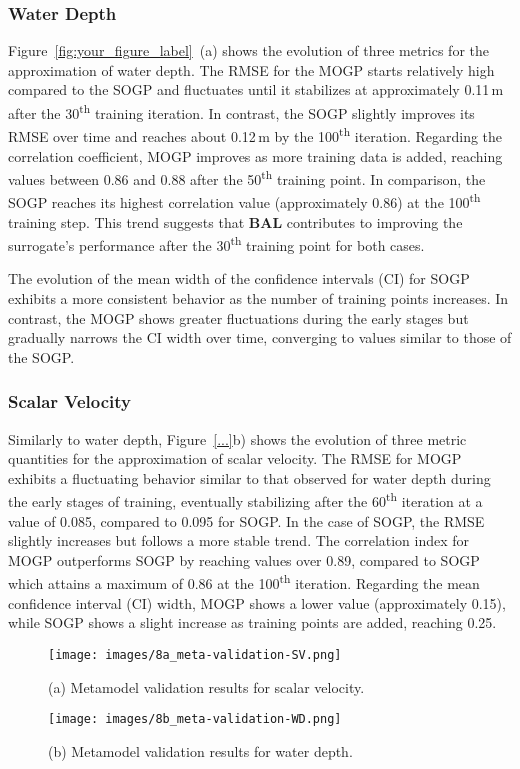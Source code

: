 \documentclass[draft,linenumbers,onecolumn]{agujournal2019} %
\begin{document}
\subsubsection{Water Depth}
Figure~\ref{fig:your_figure_label}~(a) shows the evolution of three metrics for the approximation of water depth. The RMSE for the MOGP starts relatively high compared to the SOGP and fluctuates until it stabilizes at approximately 0.11\,m after the 30\textsuperscript{th} training iteration. In contrast, the SOGP slightly improves its RMSE over time and reaches about 0.12\,m by the 100\textsuperscript{th} iteration.
Regarding the correlation coefficient, MOGP improves as more training data is added, reaching values between 0.86 and 0.88 after the 50\textsuperscript{th} training point. In comparison, the SOGP reaches its highest correlation value (approximately 0.86) at the 100\textsuperscript{th} training step. This trend suggests that \textbf{BAL} contributes to improving the surrogate’s performance after the 30\textsuperscript{th} training point for both cases.

The evolution of the mean width of the confidence intervals (CI) for SOGP exhibits a more consistent behavior as the number of training points increases. In contrast, the MOGP shows greater fluctuations during the early stages but gradually narrows the CI width over time, converging to values similar to those of the SOGP.

\subsubsection{Scalar Velocity}
Similarly to water depth, Figure~\ref{...}b) shows the evolution of three metric quantities for the approximation of scalar velocity. The RMSE for MOGP exhibits a fluctuating behavior similar to that observed for water depth during the early stages of training, eventually stabilizing after the 60\textsuperscript{th} iteration at a value of 0.085, compared to 0.095 for SOGP. In the case of SOGP, the RMSE slightly increases but follows a more stable trend. The correlation index for MOGP outperforms SOGP by reaching values over 0.89, compared to SOGP which attains a maximum of 0.86 at the 100\textsuperscript{th} iteration. Regarding the mean confidence interval (CI) width, MOGP shows a lower value (approximately 0.15), while SOGP shows a slight increase as training points are added, reaching 0.25.

\begin{figure}[!htbp]
	\centering
	\begin{minipage}[b]{0.49\textwidth}
		\centering
		\texttt{[image: images/8a\_meta-validation-SV.png]}
		\caption{(a) Metamodel validation results for scalar velocity.}
		\label{fig:meta_validation_sv}
	\end{minipage}
	\hfill
	\begin{minipage}[b]{0.49\textwidth}
		\centering
		\texttt{[image: images/8b\_meta-validation-WD.png]}
		\caption{(b) Metamodel validation results for water depth.}
		\label{fig:meta_validation_wd}
	\end{minipage}
\end{figure}
\end{document}
